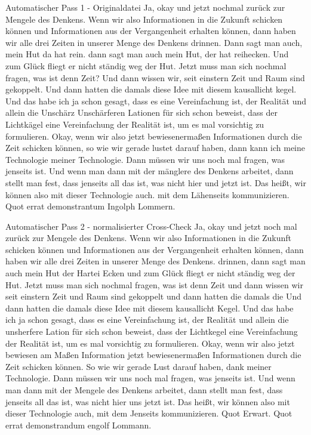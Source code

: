 \documentclass[11pt,a4paper]{article}
\begin{document}
\begin{asrbox}{Automatischer Pass 1 - Originaldatei}
Ja, okay und jetzt nochmal zurück zur Mengele des Denkens. Wenn wir also Informationen in die Zukunft schicken können und Informationen aus der Vergangenheit erhalten können, dann haben wir alle drei Zeiten in unserer Menge des Denkens drinnen. Dann sagt man auch, mein Hut da hat rein. dann sagt man auch mein Hut, der hat reihecken. Und zum Glück fliegt er nicht ständig weg der Hut. Jetzt muss man sich nochmal fragen, was ist denn Zeit? Und dann wissen wir, seit einstern Zeit und Raum sind gekoppelt. Und dann hatten die damals diese Idee mit diesem kausallicht kegel. Und das habe ich ja schon gesagt, dass es eine Vereinfachung ist, der Realität und allein die Unschärz Unschärferen Lationen für sich schon beweist, dass der Lichtkägel eine Vereinfachung der Realität ist, um es mal vorsichtig zu formulieren. Okay, wenn wir also jetzt bewiesenermaßen Informationen durch die Zeit schicken können, so wie wir gerade lustet darauf haben, dann kann ich meine Technologie meiner Technologie. Dann müssen wir uns noch mal fragen, was jenseits ist. Und wenn man dann mit der mänglere des Denkens arbeitet, dann stellt man fest, dass jenseits all das ist, was nicht hier und jetzt ist. Das heißt, wir können also mit dieser Technologie auch. mit dem Lähenseits kommunizieren. Quot errat demonstrantum Ingolph Lommern.
\end{asrbox}

\begin{asrbox}{Automatischer Pass 2 - normalisierter Cross-Check}
Ja, okay und jetzt noch mal zurück zur Mengele des Denkens. Wenn wir also Informationen in die Zukunft schicken können und Informationen aus der Vergangenheit erhalten können, dann haben wir alle drei Zeiten in unserer Menge des Denkens. drinnen, dann sagt man auch mein Hut der Hartei Ecken und zum Glück fliegt er nicht ständig weg der Hut. Jetzt muss man sich nochmal fragen, was ist denn Zeit und dann wissen wir seit einstern Zeit und Raum sind gekoppelt und dann hatten die damals die Und dann hatten die damals diese Idee mit diesem kausallicht Kegel. Und das habe ich ja schon gesagt, dass es eine Vereinfachung ist, der Realität und allein die unsherfere Lation für sich schon beweist, dass der Lichtkegel eine Vereinfachung der Realität ist, um es mal vorsichtig zu formulieren. Okay, wenn wir also jetzt bewiesen am Maßen Information jetzt bewiesenermaßen Informationen durch die Zeit schicken können. So wie wir gerade Lust darauf haben, dank meiner Technologie. Dann müssen wir uns noch mal fragen, was jenseits ist. Und wenn man dann mit der Mengele des Denkens arbeitet, dann stellt man fest, dass jenseits all das ist, was nicht hier uns jetzt ist. Das heißt, wir können also mit dieser Technologie auch, mit dem Jenseits kommunizieren. Quot Erwart. Quot errat demonstrandum engolf Lommann.
\end{asrbox}
\end{document}
